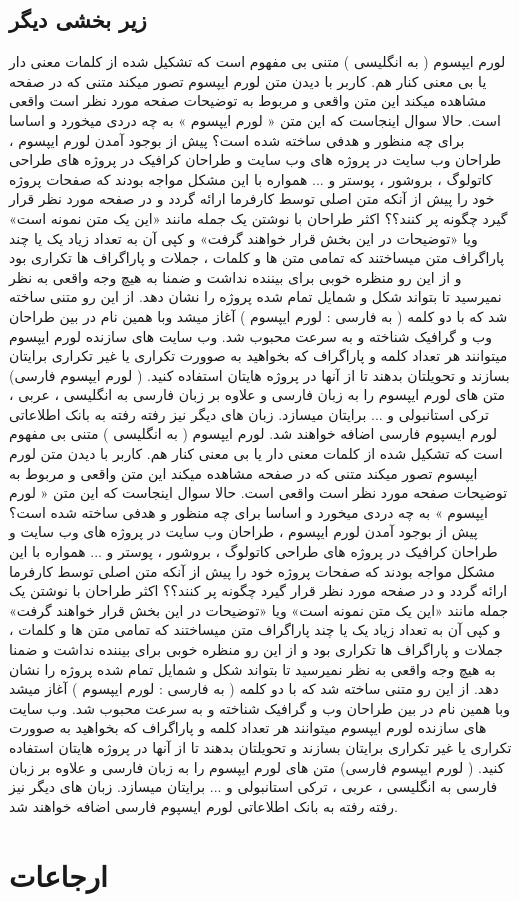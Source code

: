 \subsection{زیر بخشی دیگر}
لورم ایپسوم ( به انگلیسی  ) متنی بی مفهوم است که تشکیل شده از کلمات معنی دار یا بی معنی کنار هم. کاربر با دیدن متن لورم ایپسوم تصور میکند متنی که در صفحه مشاهده میکند این متن واقعی و مربوط به توضیحات صفحه مورد نظر است واقعی است. حالا سوال اینجاست که این متن « لورم ایپسوم » به چه دردی میخورد و اساسا برای چه منظور و هدفی ساخته شده است؟ پیش از بوجود آمدن لورم ایپسوم ، طراحان وب سایت در پروژه های وب سایت و طراحان کرافیک در پروژه های طراحی کاتولوگ ، بروشور ، پوستر و ... همواره با این مشکل مواجه بودند که صفحات پروژه خود را پیش از آنکه متن اصلی توسط کارفرما ارائه گردد و در صفحه مورد نظر قرار گیرد چگونه پر کنند؟؟ اکثر طراحان با نوشتن یک جمله مانند «این یک متن نمونه است» ویا «توضیحات در این بخش قرار خواهند گرفت» و کپی آن به تعداد زیاد یک یا چند پاراگراف متن میساختند که تمامی متن ها و کلمات ، جملات و پاراگراف ها تکراری بود و از این رو منظره خوبی برای بیننده نداشت و ضمنا به هیچ وجه واقعی به نظر نمیرسید تا بتواند شکل و شمایل تمام شده پروژه را نشان دهد. از این رو متنی ساخته شد که با دو کلمه ( به فارسی : لورم ایپسوم ) آغاز میشد وبا همین نام در بین طراحان وب و گرافیک شناخته و به سرعت محبوب شد. وب سایت های سازنده لورم ایپسوم میتوانند هر تعداد کلمه و پاراگراف که بخواهید به صوورت تکراری یا غیر تکراری برایتان بسازند و تحویلتان بدهند تا از آنها در پروژه هایتان استفاده کنید. ( لورم ایپسوم فارسی) متن های لورم ایپسوم را به زبان فارسی و علاوه بر زبان فارسی به انگلیسی ، عربی ، ترکی استانبولی و ... برایتان میسازد. زبان های دیگر نیز رفته رفته به بانک اطلاعاتی لورم ایسپوم فارسی اضافه خواهند شد.  لورم ایپسوم ( به انگلیسی  ) متنی بی مفهوم است که تشکیل شده از کلمات معنی دار یا بی معنی کنار هم. کاربر با دیدن متن لورم ایپسوم تصور میکند متنی که در صفحه مشاهده میکند این متن واقعی و مربوط به توضیحات صفحه مورد نظر است واقعی است. حالا سوال اینجاست که این متن « لورم ایپسوم » به چه دردی میخورد و اساسا برای چه منظور و هدفی ساخته شده است؟ پیش از بوجود آمدن لورم ایپسوم ، طراحان وب سایت در پروژه های وب سایت و طراحان کرافیک در پروژه های طراحی کاتولوگ ، بروشور ، پوستر و ... همواره با این مشکل مواجه بودند که صفحات پروژه خود را پیش از آنکه متن اصلی توسط کارفرما ارائه گردد و در صفحه مورد نظر قرار گیرد چگونه پر کنند؟؟ اکثر طراحان با نوشتن یک جمله مانند «این یک متن نمونه است» ویا «توضیحات در این بخش قرار خواهند گرفت» و کپی آن به تعداد زیاد یک یا چند پاراگراف متن میساختند که تمامی متن ها و کلمات ، جملات و پاراگراف ها تکراری بود و از این رو منظره خوبی برای بیننده نداشت و ضمنا به هیچ وجه واقعی به نظر نمیرسید تا بتواند شکل و شمایل تمام شده پروژه را نشان دهد. از این رو متنی ساخته شد که با دو کلمه ( به فارسی : لورم ایپسوم ) آغاز میشد وبا همین نام در بین طراحان وب و گرافیک شناخته و به سرعت محبوب شد. وب سایت های سازنده لورم ایپسوم میتوانند هر تعداد کلمه و پاراگراف که بخواهید به صوورت تکراری یا غیر تکراری برایتان بسازند و تحویلتان بدهند تا از آنها در پروژه هایتان استفاده کنید. ( لورم ایپسوم فارسی) متن های لورم ایپسوم را به زبان فارسی و علاوه بر زبان فارسی به انگلیسی ، عربی ، ترکی استانبولی و ... برایتان میسازد. زبان های دیگر نیز رفته رفته به بانک اطلاعاتی لورم ایسپوم فارسی اضافه خواهند شد.  

\section{ارجاعات}